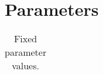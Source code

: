 \documentclass{article}
\begin{document}

\section{Parameters}



\begin{table}
    \begin{threeparttable}
    \begin{tabularx}{\textwidth}{| X | X |}
        \hline
        
	\end{tabularx}
	\caption{Fixed parameter values.}
	\label{tab:fixed_params}
    \end{threeparttable}
\end{table}

\newpage    
\printbibliography
\end{document}
